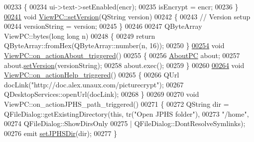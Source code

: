 \begin{DoxyCode}
00233 \{
00234     ui->text->setEnabled(encr);
00235     isEncrypt = encr;
00236 \}
\mbox{\hyperlink{class_view_p_c_ac05220df875b7c4f24405a5742476ebf}{00241}} \textcolor{keywordtype}{void} \mbox{\hyperlink{class_view_p_c_ac05220df875b7c4f24405a5742476ebf}{ViewPC::setVersion}}(QString version)
00242 \{
00243     \textcolor{comment}{// Version setup}
00244     versionString = version;
00245 \}
00246 
00247 QByteArray ViewPC::bytes(\textcolor{keywordtype}{long} \textcolor{keywordtype}{long} n)
00248 \{
00249     \textcolor{keywordflow}{return} QByteArray::fromHex(QByteArray::number(n, 16));
00250 \}
\mbox{\hyperlink{class_view_p_c_a09a46da4d492eb3dde88f35dc58c997b}{00254}} \textcolor{keywordtype}{void} \mbox{\hyperlink{class_view_p_c_a09a46da4d492eb3dde88f35dc58c997b}{ViewPC::on\_actionAbout\_triggered}}()
00255 \{
00256     \mbox{\hyperlink{class_about_p_c}{AboutPC}} about;
00257     about.\mbox{\hyperlink{class_about_p_c_aa3815d4826d0c8d87122449537a0a4d5}{setVersion}}(versionString);
00258     about.exec();
00259 \}
00260 
\mbox{\hyperlink{class_view_p_c_a0d252ff4829260c6c76769fbd24b7cd7}{00264}} \textcolor{keywordtype}{void} \mbox{\hyperlink{class_view_p_c_a0d252ff4829260c6c76769fbd24b7cd7}{ViewPC::on\_actionHelp\_triggered}}()
00265 \{
00266     QUrl docLink(\textcolor{stringliteral}{"http://doc.alex.unaux.com/picturecrypt"});
00267     QDesktopServices::openUrl(docLink);
00268 \}
00269 
00270 \textcolor{keywordtype}{void} ViewPC::on\_actionJPHS\_path\_triggered()
00271 \{
00272     QString dir = QFileDialog::getExistingDirectory(\textcolor{keyword}{this}, tr(\textcolor{stringliteral}{"Open JPHS folder"}),
00273                                                     \textcolor{stringliteral}{"/home"},
00274                                                     QFileDialog::ShowDirsOnly
00275                                                     | QFileDialog::DontResolveSymlinks);
00276     emit \mbox{\hyperlink{class_view_p_c_ababceedc355ecc1217a4c708e19e5e6b}{setJPHSDir}}(dir);
00277 \}
\end{DoxyCode}
